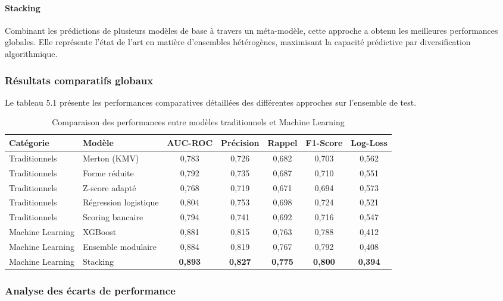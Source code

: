 \paragraph{Stacking} Combinant les prédictions de plusieurs modèles de base à travers un méta-modèle, cette approche a obtenu les meilleures performances globales. Elle représente l'état de l'art en matière d'ensembles hétérogènes, maximisant la capacité prédictive par diversification algorithmique.

\subsubsection{Résultats comparatifs globaux}

Le tableau 5.1 présente les performances comparatives détaillées des différentes approches sur l'ensemble de test.

\begin{table}[htbp]
  \centering
  \caption{Comparaison des performances entre modèles traditionnels et Machine Learning}
  \begin{tabular}{llccccc}
    \toprule
    \textbf{Catégorie} & \textbf{Modèle} & \textbf{AUC-ROC} & \textbf{Précision} & \textbf{Rappel} & \textbf{F1-Score} & \textbf{Log-Loss} \\
    \midrule
    Traditionnels & Merton (KMV) & 0,783 & 0,726 & 0,682 & 0,703 & 0,562 \\
    Traditionnels & Forme réduite & 0,792 & 0,735 & 0,687 & 0,710 & 0,551 \\
    Traditionnels & Z-score adapté & 0,768 & 0,719 & 0,671 & 0,694 & 0,573 \\
    Traditionnels & Régression logistique & 0,804 & 0,753 & 0,698 & 0,724 & 0,521 \\
    Traditionnels & Scoring bancaire & 0,794 & 0,741 & 0,692 & 0,716 & 0,547 \\
    Machine Learning & XGBoost & 0,881 & 0,815 & 0,763 & 0,788 & 0,412 \\
    Machine Learning & Ensemble modulaire & 0,884 & 0,819 & 0,767 & 0,792 & 0,408 \\
    Machine Learning & Stacking & \textbf{0,893} & \textbf{0,827} & \textbf{0,775} & \textbf{0,800} & \textbf{0,394} \\
    \bottomrule
  \end{tabular}
\end{table}

\subsubsection{Analyse des écarts de performance}

